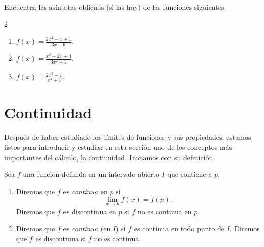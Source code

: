 \documentclass[12pt,a4paper]{book}
\begin{document}
    \begin{ejercicio}\label{ej:189}
        Encuentra las asíntotas oblicuas (si las hay) de las funciones
        siguientes:
        \begin{multicols}{2}
        \begin{enumerate}[nosep]
            \item $f(x)=\frac{2x^{2}-x+1}{3x-6}$.
            \item $f(x)=\frac{x^{3}-2x+4}{3x^{2}+1}$.
            \item $f(x)=\frac{2x^{5}-7}{x^{4}+3}$.
        \end{enumerate}
        \end{multicols}
    \end{ejercicio}

    \section{Continuidad}\label{sec:continuidad}

    Después de haber estudiado los límites de funciones y sus propiedades,
    estamos listos para introducir y estudiar en esta sección uno de los conceptos
    más importantes del cálculo, la continuidad. Iniciamos con su definición.

    \begin{definicion}[Continuidad]\label{def:39}
        Sea $f$ una función definida en un intervalo
        abierto $I$ que contiene a $p$.
        \begin{enumerate}[nosep]
            \item Diremos que $f$ es \textit{continua} en $p$ si
            \begin{equation}\label{eq:4.42}
                \lim_{x\to p}f(x)=f(p).
            \end{equation}
            Diremos que $f$ es discontinua en $p$ si $f$ no es continua en $p$.
            \item Diremos que $f$ es \textit{continua} (en $I$) si $f$ es continua en todo punto de $I$.
            Diremos que $f$ es discontinua si $f$ no es continua.
        \end{enumerate}
    \end{definicion}
\end{document}
